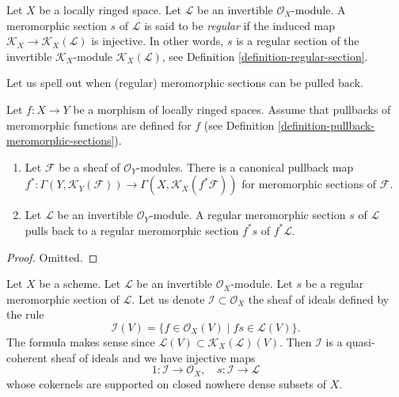 \begin{definition}
\label{definition-regular-meromorphic-section}
Let $X$ be a locally ringed space.
Let $\mathcal{L}$ be an invertible $\mathcal{O}_X$-module.
A meromorphic section $s$ of $\mathcal{L}$ is said to be {\it regular}
if the induced map
$\mathcal{K}_X \to \mathcal{K}_X(\mathcal{L})$
is injective. In other words, $s$ is a regular
section of the invertible $\mathcal{K}_X$-module
$\mathcal{K}_X(\mathcal{L})$, see
Definition \ref{definition-regular-section}.
\end{definition}

\noindent
Let us spell out when (regular) meromorphic sections can be pulled back.

\begin{lemma}
\label{lemma-meromorphic-sections-pullback}
Let $f : X \to Y$ be a morphism of locally ringed spaces.
Assume that pullbacks of meromorphic functions are defined
for $f$ (see
Definition \ref{definition-pullback-meromorphic-sections}).
\begin{enumerate}
\item Let $\mathcal{F}$ be a sheaf of $\mathcal{O}_Y$-modules.
There is a canonical pullback map
$f^* : \Gamma(Y, \mathcal{K}_Y(\mathcal{F})) \to
\Gamma(X, \mathcal{K}_X(f^*\mathcal{F}))$
for meromorphic sections of $\mathcal{F}$.
\item Let $\mathcal{L}$ be an invertible $\mathcal{O}_Y$-module.
A regular meromorphic section $s$ of $\mathcal{L}$ pulls back
to a regular meromorphic section $f^*s$ of $f^*\mathcal{L}$.
\end{enumerate}
\end{lemma}

\begin{proof}
Omitted.
\end{proof}

\begin{lemma}
\label{lemma-regular-meromorphic-ideal-denominators}
Let $X$ be a scheme.
Let $\mathcal{L}$ be an invertible $\mathcal{O}_X$-module.
Let $s$ be a regular meromorphic section of $\mathcal{L}$.
Let us denote $\mathcal{I} \subset \mathcal{O}_X$ the
sheaf of ideals defined by the rule
$$
\mathcal{I}(V)
=
\{f \in \mathcal{O}_X(V) \mid fs \in \mathcal{L}(V)\}.
$$
The formula makes sense since
$\mathcal{L}(V) \subset \mathcal{K}_X(\mathcal{L})(V)$.
Then $\mathcal{I}$ is a quasi-coherent sheaf of ideals and
we have injective maps
$$
1 : \mathcal{I} \longrightarrow \mathcal{O}_X,
\quad
s : \mathcal{I} \longrightarrow \mathcal{L}
$$
whose cokernels are supported on closed nowhere dense subsets of $X$.
\end{lemma}


